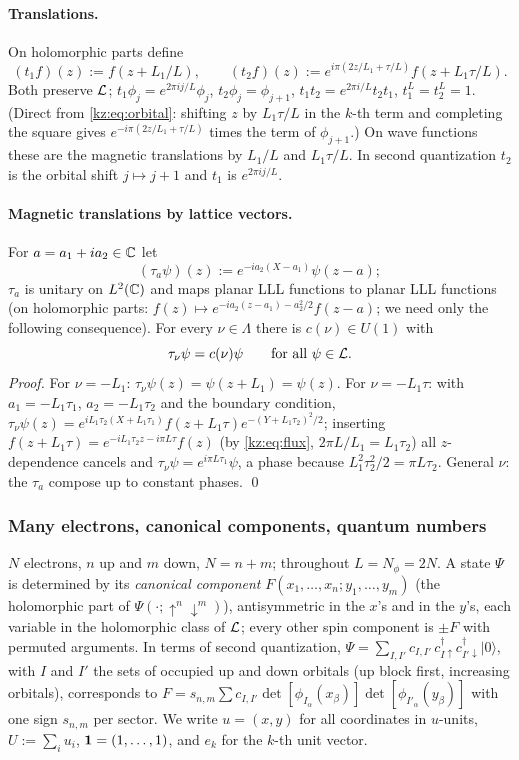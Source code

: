 \paragraph{Translations.} On holomorphic parts define
\[
(t_1f)(z):=f(z+L_1/L),\qquad (t_2f)(z):=e^{i\pi(2z/L_1+\tau/L)}f(z+L_1\tau/L).
\]
Both preserve $\mathcal{L}$; $t_1\phi_j=e^{2\pi ij/L}\phi_j$, $t_2\phi_j=\phi_{j+1}$, $t_1t_2=e^{2\pi i/L}t_2t_1$,
$t_1^L=t_2^L=1$. (Direct from \eqref{kz:eq:orbital}: shifting $z$ by $L_1\tau/L$ in the $k$-th term and
completing the square gives $e^{-i\pi(2z/L_1+\tau/L)}$ times the term of $\phi_{j+1}$.) On wave
functions these are the magnetic translations by $L_1/L$ and $L_1\tau/L$. In second quantization
$t_2$ is the orbital shift $j\mapsto j+1$ and $t_1$ is $e^{2\pi ij/L}$.

\paragraph{Magnetic translations by lattice vectors.} For $a=a_1+ia_2\in\mathbb{C}$ let
\[
(\tau_a\psi)(z):=e^{-ia_2(X-a_1)}\psi(z-a);
\]
$\tau_a$ is unitary on $L^2(\mathbb{C})$ and maps planar LLL
functions to planar LLL functions (on holomorphic parts: $f(z)\mapsto e^{-ia_2(z-a_1)-a_2^2/2}f(z-a)$; we need only the following
consequence). For every $\nu\in\Lambda$
there is $c(\nu)\in U(1)$ with
\begin{equation}\label{kz:eq:bc-translation}
\tau_\nu\psi=c(\nu)\psi\qquad\text{for all }\psi\in\mathcal{L} .
\end{equation}
\emph{Proof.} For $\nu=-L_1$: $\tau_\nu\psi(z)=\psi(z+L_1)=\psi(z)$. For $\nu=-L_1\tau$: with
$a_1=-L_1\tau_1$, $a_2=-L_1\tau_2$ and the boundary condition,
$\tau_\nu\psi(z)=e^{iL_1\tau_2(X+L_1\tau_1)}f(z+L_1\tau)e^{-(Y+L_1\tau_2)^2/2}$; inserting
$f(z+L_1\tau)=e^{-iL_1\tau_2z-i\pi L\tau}f(z)$ (by \eqref{kz:eq:flux}, $2\pi L/L_1=L_1\tau_2$) all $z$-dependence
cancels and $\tau_\nu\psi=e^{i\pi L\tau_1}\psi$, a phase because $L_1^2\tau_2^2/2=\pi L\tau_2$. General
$\nu$: the $\tau_a$ compose up to constant phases. \qed

\subsubsection{Many electrons, canonical components, quantum numbers}\label{kz:sec:many}

$N$ electrons, $n$ up and $m$ down, $N=n+m$; throughout $L=N_\phi=2N$. A state
$\Psi$ is determined by its \emph{canonical component} $F(x_1,\dots,x_n;y_1,\dots,y_m)$ (the
holomorphic part of $\Psi(\cdot;\uparrow^n\downarrow^m)$), antisymmetric in the $x$'s and in the
$y$'s, each variable in the holomorphic class of $\mathcal{L}$; every other spin component is $\pm F$ with
permuted arguments. In terms of second quantization,
$\Psi=\sum_{I,I'}c_{I,I'}\,c^\dagger_{I\uparrow}c^\dagger_{I'\downarrow}|0\rangle$, with $I$ and $I'$ the sets of occupied
up and down orbitals (up block first, increasing orbitals), corresponds to
$F=s_{n,m}\sum c_{I,I'}\det[\phi_{I_\alpha}(x_\beta)]\det[\phi_{I'_\alpha}(y_\beta)]$
with one sign $s_{n,m}$ per sector. We write $u=(x,y)$ for all coordinates in $u$-units, $U:=\sum_iu_i$, $\mathbf{1}=(1,\dots,1)$, and $e_k$ for
the $k$-th unit vector.


